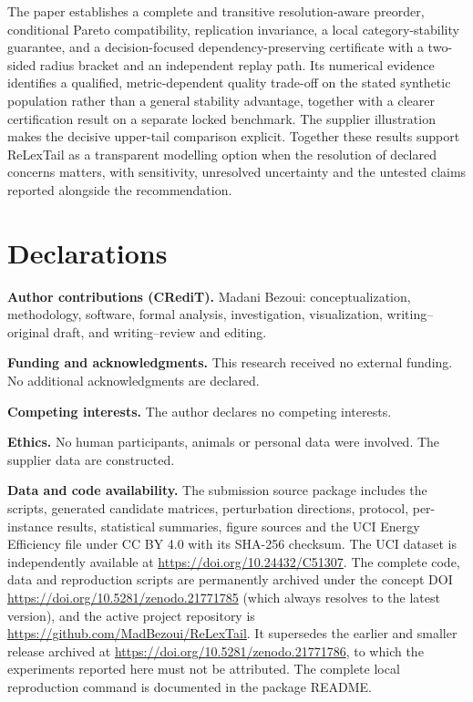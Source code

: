 The paper establishes a complete and transitive resolution-aware preorder, conditional Pareto compatibility, replication invariance, a local category-stability guarantee, and a decision-focused dependency-preserving certificate with a two-sided radius bracket and an independent replay path. Its numerical evidence identifies a qualified, metric-dependent quality trade-off on the stated synthetic population rather than a general stability advantage, together with a clearer certification result on a separate locked benchmark. The supplier illustration makes the decisive upper-tail comparison explicit. Together these results support ReLexTail as a transparent modelling option when the resolution of declared concerns matters, with sensitivity, unresolved uncertainty and the untested claims reported alongside the recommendation.

\section*{Declarations}
\noindent\textbf{Author contributions (CRediT).} Madani Bezoui: conceptualization, methodology, software, formal analysis, investigation, visualization, writing--original draft, and writing--review and editing.

\noindent\textbf{Funding and acknowledgments.} This research received no external funding. No additional acknowledgments are declared.

\noindent\textbf{Competing interests.} The author declares no competing interests.

\noindent\textbf{Ethics.} No human participants, animals or personal data were involved. The supplier data are constructed.

\noindent\textbf{Data and code availability.} The submission source package includes the scripts, generated candidate matrices, perturbation directions, protocol, per-instance results, statistical summaries, figure sources and the UCI Energy Efficiency file under CC BY 4.0 with its SHA-256 checksum. The UCI dataset is independently available at \url{https://doi.org/10.24432/C51307}. The complete code, data and reproduction scripts are permanently archived under the concept DOI \url{https://doi.org/10.5281/zenodo.21771785} (which always resolves to the latest version), and the active project repository is \url{https://github.com/MadBezoui/ReLexTail}. It supersedes the earlier and smaller release archived at \url{https://doi.org/10.5281/zenodo.21771786}, to which the experiments reported here must not be attributed. The complete local reproduction command is documented in the package README.
